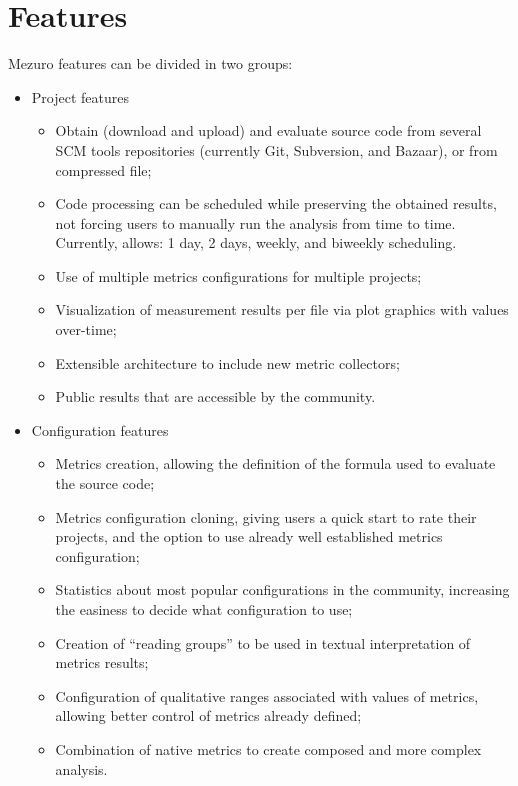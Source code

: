 \section{Features}
\label{sec:features}

Mezuro features can be divided in two groups:

\begin{itemize}
    \item Project features
    \begin{itemize}
        \item Obtain (download and upload) and evaluate source code from
            several SCM tools repositories (currently Git, Subversion, and
            Bazaar), or from compressed file;
        \item Code processing can be scheduled while preserving the obtained
            results, not forcing users to manually run the analysis from time
            to time. Currently, allows: 1 day, 2 days, weekly, and biweekly
            scheduling.
        \item Use of multiple metrics configurations for multiple projects;
        \item Visualization of measurement results per file via plot graphics
            with values over-time;
        \item Extensible architecture to include new metric collectors;
        \item Public results that are accessible by the community.
    \end{itemize}

    \item Configuration features
    \begin{itemize}
        \item Metrics creation, allowing the definition of the formula
            used to evaluate the source code;
        \item Metrics configuration cloning, giving users a quick start to rate
            their projects, and the option to use already well established
            metrics configuration;
        \item Statistics about most popular configurations in the community,
            increasing the easiness to decide what configuration to use;
        \item Creation of ``reading groups'' to be used in textual
            interpretation of metrics results;
        \item Configuration of qualitative ranges associated with values of
            metrics, allowing better control of metrics already defined;
        \item Combination of native metrics to create composed and more complex
            analysis.
    \end{itemize}
\end{itemize}


